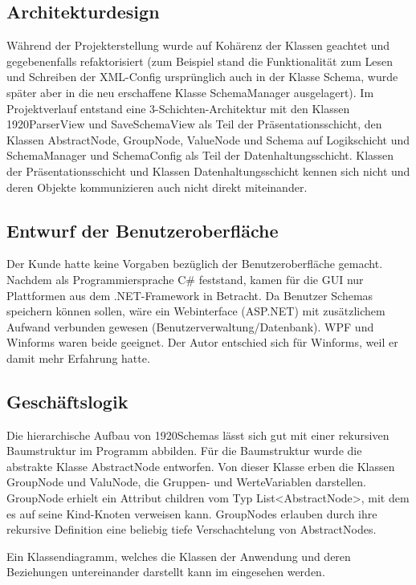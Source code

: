 \subsection{Architekturdesign}
\label{sec:Architekturdesign}
Während der Projekterstellung wurde auf Kohärenz der Klassen geachtet und gegebenenfalls refaktorisiert (zum Beispiel stand die Funktionalität zum Lesen und Schreiben der XML-Config ursprünglich auch in der Klasse Schema, wurde später aber in die neu erschaffene Klasse SchemaManager ausgelagert). Im Projektverlauf entstand eine 3-Schichten-Architektur mit den Klassen 1920ParserView und SaveSchemaView als Teil der Präsentationsschicht, den Klassen AbstractNode, GroupNode, ValueNode und Schema auf Logikschicht und SchemaManager und SchemaConfig als Teil der Datenhaltungsschicht. Klassen der Präsentationsschicht und Klassen Datenhaltungsschicht kennen sich nicht und deren Objekte kommunizieren auch nicht direkt miteinander.

\subsection{Entwurf der Benutzeroberfläche}
\label{sec:Benutzeroberflaeche}
Der Kunde hatte keine Vorgaben bezüglich der Benutzeroberfläche gemacht. 
Nachdem als Programmiersprache C\# feststand, kamen für die \ac{GUI} nur  Plattformen aus dem .NET-Framework in Betracht. Da Benutzer Schemas speichern können sollen, wäre ein Webinterface (ASP.NET) mit zusätzlichem Aufwand verbunden gewesen (Benutzerverwaltung/Datenbank). \ac{WPF} und Winforms waren beide geeignet. Der Autor entschied sich für Winforms, weil er damit mehr Erfahrung hatte.

\subsection{Geschäftslogik}
\label{sec:Geschaeftslogik}
Die hierarchische Aufbau von 1920Schemas lässt sich gut mit einer rekursiven Baumstruktur im Programm abbilden. 
Für die Baumstruktur wurde die abstrakte Klasse AbstractNode entworfen. Von dieser Klasse erben die Klassen GroupNode und ValuNode, die Gruppen- und WerteVariablen darstellen. GroupNode erhielt ein Attribut children vom Typ List<AbstractNode>, mit dem es auf seine Kind-Knoten verweisen kann. GroupNodes erlauben durch ihre rekursive Definition eine beliebig tiefe Verschachtelung von AbstractNodes.

Ein Klassendiagramm, welches die Klassen der Anwendung und deren Beziehungen untereinander darstellt kann im  eingesehen werden.


